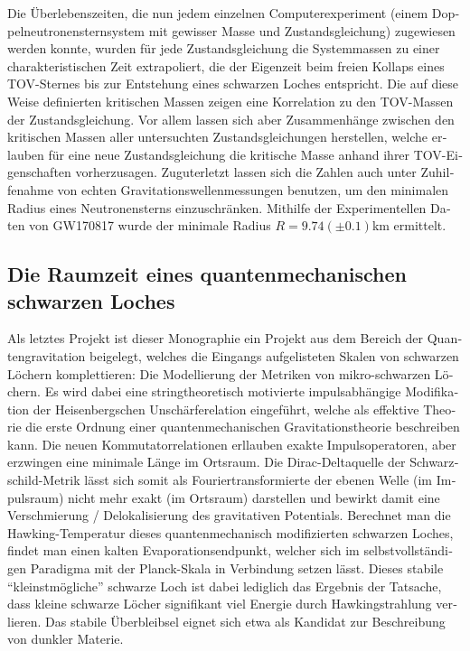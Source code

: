 \begin{otherlanguage}{german}
\begin{fullwidth}
\begin{center}
\begin{adjustwidth}{1cm}{1cm}
Die Überlebenszeiten, die nun jedem einzelnen Computerexperiment (einem
Doppelneutronensternsystem mit gewisser Masse und Zustandsgleichung) zugewiesen
werden konnte, wurden für jede Zustandsgleichung die Systemmassen zu einer
charakteristischen Zeit extrapoliert, die der Eigenzeit beim freien Kollaps
eines TOV-Sternes bis zur Entstehung eines schwarzen Loches entspricht. Die auf
diese Weise definierten kritischen Massen zeigen eine Korrelation zu den
TOV-Massen der Zustandsgleichung. Vor allem lassen sich aber Zusammenhänge
zwischen den kritischen Massen aller untersuchten Zustandsgleichungen
herstellen, welche erlauben für eine neue Zustandsgleichung die kritische Masse
anhand ihrer TOV-Eigenschaften vorherzusagen. Zuguterletzt lassen sich die
Zahlen auch unter Zuhilfenahme von echten Gravitationswellenmessungen benutzen,
um den minimalen Radius eines Neutronensterns einzuschränken. Mithilfe der
Experimentellen Daten von GW170817 wurde der minimale Radius
$R=9.74(\pm 0.1)$km ermittelt.

\subsection*{Die Raumzeit eines quantenmechanischen schwarzen Loches}
Als letztes Projekt ist dieser Monographie ein Projekt aus dem
Bereich der Quantengravitation beigelegt, welches die Eingangs aufgelisteten
Skalen von schwarzen Löchern komplettieren: Die Modellierung der Metriken von
mikro-schwarzen Löchern. Es wird dabei eine stringtheoretisch
motivierte impulsabhängige Modifikation der Heisenbergschen Unschärferelation
eingeführt, welche als effektive Theorie die erste Ordnung einer
quantenmechanischen Gravitationstheorie beschreiben kann. Die neuen
Kommutatorrelationen erllauben exakte Impulsoperatoren, aber erzwingen
eine minimale Länge im Ortsraum. Die Dirac-Deltaquelle der Schwarzschild-Metrik 
lässt sich somit als Fouriertransformierte der ebenen Welle (im Impulsraum)
nicht mehr exakt (im Ortsraum) darstellen und bewirkt damit
eine Verschmierung / Delokalisierung des gravitativen Potentials.
Berechnet man die Hawking-Temperatur
dieses quantenmechanisch modifizierten schwarzen Loches, findet man einen kalten
Evaporationsendpunkt, welcher sich im selbstvollständigen Paradigma mit der
Planck-Skala in Verbindung setzen lässt. Dieses stabile ``kleinstmögliche''
schwarze Loch ist dabei lediglich das Ergebnis der Tatsache, dass kleine
schwarze Löcher signifikant viel Energie durch Hawkingstrahlung verlieren.
Das stabile Überbleibsel eignet sich etwa als Kandidat zur Beschreibung von
dunkler Materie.


\end{adjustwidth}
\end{center}
\end{fullwidth}
\end{otherlanguage}
